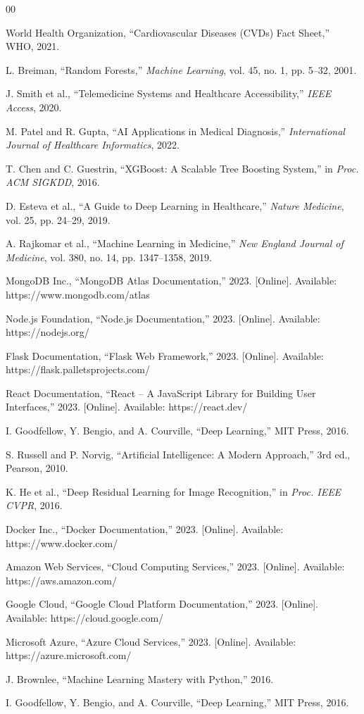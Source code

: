 \documentclass[conference]{IEEEtran}
\begin{document}
\begin{thebibliography}{00}

 World Health Organization, ``Cardiovascular Diseases (CVDs) Fact Sheet,'' WHO, 2021.

 L. Breiman, ``Random Forests,'' \textit{Machine Learning}, vol. 45, no. 1, pp. 5--32, 2001.

 J. Smith et al., ``Telemedicine Systems and Healthcare Accessibility,'' \textit{IEEE Access}, 2020.

 M. Patel and R. Gupta, ``AI Applications in Medical Diagnosis,'' \textit{International Journal of Healthcare Informatics}, 2022.

 T. Chen and C. Guestrin, ``XGBoost: A Scalable Tree Boosting System,'' in \textit{Proc. ACM SIGKDD}, 2016.

 D. Esteva et al., ``A Guide to Deep Learning in Healthcare,'' \textit{Nature Medicine}, vol. 25, pp. 24--29, 2019.

 A. Rajkomar et al., ``Machine Learning in Medicine,'' \textit{New England Journal of Medicine}, vol. 380, no. 14, pp. 1347--1358, 2019.

 MongoDB Inc., ``MongoDB Atlas Documentation,'' 2023. [Online]. Available: https://www.mongodb.com/atlas

 Node.js Foundation, ``Node.js Documentation,'' 2023. [Online]. Available: https://nodejs.org/

 Flask Documentation, ``Flask Web Framework,'' 2023. [Online]. Available: https://flask.palletsprojects.com/

 React Documentation, ``React -- A JavaScript Library for Building User Interfaces,'' 2023. [Online]. Available: https://react.dev/

 I. Goodfellow, Y. Bengio, and A. Courville, ``Deep Learning,'' MIT Press, 2016.

 S. Russell and P. Norvig, ``Artificial Intelligence: A Modern Approach,'' 3rd ed., Pearson, 2010.

 K. He et al., ``Deep Residual Learning for Image Recognition,'' in \textit{Proc. IEEE CVPR}, 2016.

 Docker Inc., ``Docker Documentation,'' 2023. [Online]. Available: https://www.docker.com/

 Amazon Web Services, ``Cloud Computing Services,'' 2023. [Online]. Available: https://aws.amazon.com/

 Google Cloud, ``Google Cloud Platform Documentation,'' 2023. [Online]. Available: https://cloud.google.com/

 Microsoft Azure, ``Azure Cloud Services,'' 2023. [Online]. Available: https://azure.microsoft.com/

 J. Brownlee, ``Machine Learning Mastery with Python,'' 2016.

 I. Goodfellow, Y. Bengio, and A. Courville, ``Deep Learning,'' MIT Press, 2016.

\end{thebibliography}
\end{document}
